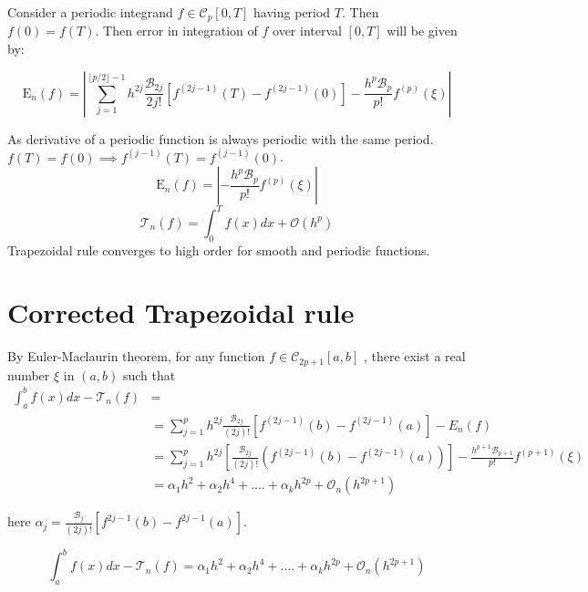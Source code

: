 \documentclass[../document.tex]{subfiles}
\begin{document}
	\begin{lemma}
		Consider a periodic integrand $f \in \mathcal{C}_p[0,T]$ having period $T$. Then $f(0) = f(T)$. Then error in integration of $f$ over interval $[0,T]$ will be given by:
		
		$$
		\mathrm{E}_n(f)
		= \left| \sum_{j=1}^{ \lfloor p/2\rfloor -1 }  h^{2j} \frac{\mathcal{B}_{2j}}{2j!}
		\left[
		f^{(2j-1)}(T) - f^{(2j-1)}(0) 
		\right] -  \frac{h^p  \mathcal{B}_p  }{p!}  f^{ (p)} (\xi) \right|
		$$
		
		As derivative of a periodic function is always periodic with the same period.
		$f(T) = f(0) \implies f^{(j-1)}(T) = f^{(j-1)}(0)$.
		$$
		\mathrm{E}_n(f) = \left| - \frac{h^p  \mathcal{B}_p  }{p!}  f^{ (p)} (\xi)\right| 
		$$
		$$
		\mathcal{T}_n(f) = \int_0^T f(x)dx +  \mathcal{O}(h^p)
		$$
		Trapezoidal rule converges to high order for smooth and periodic functions.
	\end{lemma}
	
	
	\section{Corrected Trapezoidal rule}
	
	By Euler-Maclaurin theorem, for any function $f \in \mathcal{C}_{2p+1}[a,b]$ ,
	there exist a real number $\xi$ in $(a,b)$ such that
	\begin{equation*}
		\begin{split}
			\int_a^b f(x)dx - \mathcal{T}_n(f) &=
			\\
			&= 
			\sum_{j=1}^{p}  h^{2j} \frac{\mathcal{B}_{2j}}{(2j)!}
			\left[
			f^{(2j-1)}(b) - f^{(2j-1)}(a) 
			\right] -  E_n(f) 
			\\
			&= 
			\sum_{j=1}^{p}  h^{2j}
			\left[\frac{\mathcal{B}_{2j}}{(2j)!}
			\left(
			f^{(2j-1)}(b) - f^{(2j-1)}(a) 
			\right) \right] 
			-\frac{h^{p+1}  \mathcal{B}_{p+1}  }{p!}  
			f^{ (p+1)} (\xi)
			\\
			&=\alpha_1h^2 +\alpha_2h^4 + .... + 
			\alpha_k h^{2p} + \mathcal{O}_n(h^{2p+1})
		\end{split}
	\end{equation*}
	
	here $\alpha_j =\frac{ \mathcal{B}_{j} }{(2j)!}\left[ f^{2j-1}(b) - f^{2j-1}(a) \right] $.
	
	$$
	\int_a^b f(x)dx - \mathcal{T}_n(f) =\alpha_1h^2 +\alpha_2h^4 + .... + \alpha_k h^{2p} + \mathcal{O}_n(h^{2p+1})
	$$
	
\end{document}
